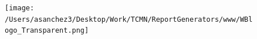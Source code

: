 \documentclass{article}\usepackage[]{graphicx}\usepackage[]{color}
\begin{document}
\begin{figure}
  \vspace{4ex}
  \begin{minipage}[c]{0.33\textwidth}
    \hspace*{+0.3cm} \texttt{[image: /Users/asanchez3/Desktop/Work/TCMN/ReportGenerators/www/WBlogo\_Transparent.png]}
  \end{minipage}
  \begin{minipage}[c]{0.65\textwidth}
    \vspace*{-0.1cm}
  \end{minipage}
\end{figure}
\end{document}

